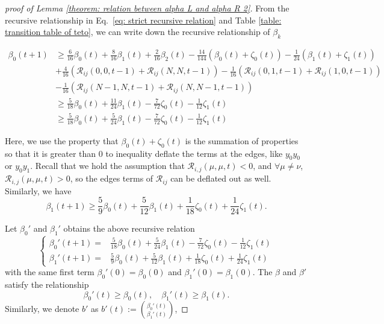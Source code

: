 \documentclass[journal=jctcce,a4paper,manuscript=article]{achemso}
\begin{document}
\begin{proof}[proof of Lemma \ref{theorem: relation between alpha L and alpha R 2}]
  From the recursive relationship in Eq.~\eqref{eq: strict recursive relation} and Table \ref{table: transition table of teto}, we can write down the recursive relationship of $\beta_k$

  \begin{align}
    \beta_0(t+1) & \geq \frac{6}{16} \beta_0(t)+\frac{8}{16} \beta_1(t) + \frac{2}{16}\beta_2(t)-\frac{14}{144}\left(\beta_0(t)+\zeta_0(t)\right)-\frac{1}{24}\left(\beta_1(t)+\zeta_1(t)\right)\nonumber \\
                 & + \frac{4}{16}(\mathscr{R}_{i j}(0,0, t-1) + \mathscr{R}_{i j}(N,N, t-1)) -  \frac{1}{16}(\mathscr{R}_{i j}(0,1, t-1) + \mathscr{R}_{i j}(1,0, t-1))\nonumber                          \\
                 & - \frac{1}{16}(\mathscr{R}_{i j}(N-1,N, t-1) + \mathscr{R}_{i j}(N,N-1, t-1))\nonumber                                                                                                 \\
                 & \geq \frac{5}{18} \beta_0(t)+\frac{11}{24} \beta_1(t)-\frac{7}{72} \zeta_0(t)-\frac{1}{12} \zeta_1(t)                                                                                  \\
                 & \geq \frac{5}{18} \beta_0(t)+\frac{5}{24} \beta_1(t)-\frac{7}{72} \zeta_0(t)-\frac{1}{12} \zeta_1(t)
  \end{align}

  Here, we use the property that $\beta_0(t)+\zeta_0(t)$ is the summation of
  properties so that it is greater than $0$ to inequality deflate the terms at
  the edges, like $y_0y_0$ or $ y_0y_1$. Recall that we hold the assumption that
  $\mathscr{R}_{i, j}(\mu, \mu, t)<0$, and $\forall \mu \neq \nu$,
  $\mathscr{R}_{i, j}(\mu, \mu, t)>0$, so the edges terms of $\mathscr{R}_{i j}$
  can be deflated out as well. Similarly, we have
  \begin{equation}
    \beta_1(t+1)  \geq \frac{5}{9} \beta_0(t)+\frac{5}{12} \beta_1(t)+\frac{1}{18} \zeta_0(t)+\frac{1}{24} \zeta_1(t).
  \end{equation}

  Let $\beta_0'$ and $\beta_1'$ obtains the above recursive relation
  \begin{equation}
    \begin{cases}
      \beta_0'(t+1) =  & \frac{5}{18} \beta_0(t)+\frac{5}{24} \beta_1(t)-\frac{7}{72} \zeta_0(t)-\frac{1}{12} \zeta_1(t) \\
      \beta_1'(t+1)  = & \frac{5}{9} \beta_0(t)+\frac{5}{12} \beta_1(t)+\frac{1}{18} \zeta_0(t)+\frac{1}{24} \zeta_1(t)
    \end{cases}
    \label{eq: zz anonymous 25}
  \end{equation}
  with the same first term $\beta_0'(0) = \beta_0(0)$ and $\beta_1'(0) = \beta_1(0)$. The $\beta$ and $\beta'$ satisfy the relationship
  \begin{equation}
    \beta_0'(t) \geq \beta_0(t),\quad  \beta_1'(t) \geq \beta_1(t).
  \end{equation}
  Similarly, we denote $b'$ as $b'(t):=\binom{\beta_0'(t)}{\beta_1'(t)}$,


\end{proof}
\end{document}
